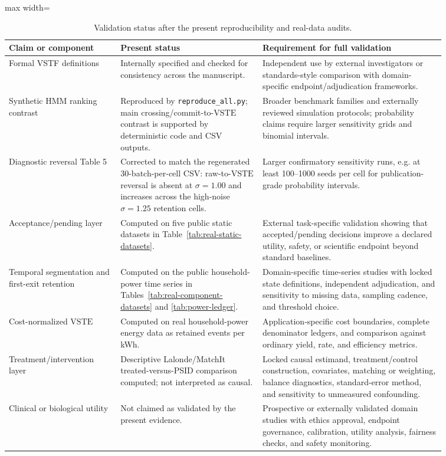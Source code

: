 \documentclass[11pt,a4paper]{article}
\newcommand{\VSTE}{\ensuremath{\mathrm{VSTE}}}
\newcommand{\1}{\mathbf{1}}
\begin{document}
\begin{table}[h]
\centering
\caption{Validation status after the present reproducibility and real-data audits.}
\label{tab:full-validation-status}
\scriptsize
\begin{adjustbox}{max width=\linewidth}
\begin{tabular}{p{0.22\linewidth}p{0.28\linewidth}p{0.36\linewidth}}
\toprule
Claim or component & Present status & Requirement for full validation \\
\midrule
Formal VSTF definitions & Internally specified and checked for consistency across the manuscript. & Independent use by external investigators or standards-style comparison with domain-specific endpoint/adjudication frameworks. \\
Synthetic HMM ranking contrast & Reproduced by \texttt{reproduce\_all.py}; main crossing/commit-to-\VSTE{} contrast is supported by deterministic code and CSV outputs. & Broader benchmark families and externally reviewed simulation protocols; probability claims require larger sensitivity grids and binomial intervals. \\
Diagnostic reversal Table 5 & Corrected to match the regenerated 30-batch-per-cell CSV: raw-to-\VSTE{} reversal is absent at $\sigma=1.00$ and increases across the high-noise $\sigma=1.25$ retention cells. & Larger confirmatory sensitivity runs, e.g. at least 100--1000 seeds per cell for publication-grade probability intervals. \\
Acceptance/pending layer & Computed on five public static datasets in Table~\ref{tab:real-static-datasets}. & External task-specific validation showing that accepted/pending decisions improve a declared utility, safety, or scientific endpoint beyond standard baselines. \\
Temporal segmentation and first-exit retention & Computed on the public household-power time series in Tables~\ref{tab:real-component-datasets} and \ref{tab:power-ledger}. & Domain-specific time-series studies with locked state definitions, independent adjudication, and sensitivity to missing data, sampling cadence, and threshold choice. \\
Cost-normalized \VSTE{} & Computed on real household-power energy data as retained events per kWh. & Application-specific cost boundaries, complete denominator ledgers, and comparison against ordinary yield, rate, and efficiency metrics. \\
Treatment/intervention layer & Descriptive Lalonde/MatchIt treated-versus-PSID comparison computed; not interpreted as causal. & Locked causal estimand, treatment/control construction, covariates, matching or weighting, balance diagnostics, standard-error method, and sensitivity to unmeasured confounding. \\
Clinical or biological utility & Not claimed as validated by the present evidence. & Prospective or externally validated domain studies with ethics approval, endpoint governance, calibration, utility analysis, fairness checks, and safety monitoring. \\
\bottomrule
\end{tabular}
\end{adjustbox}
\end{table}
\end{document}
